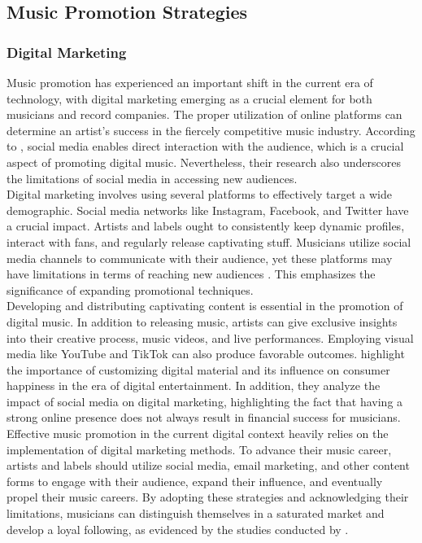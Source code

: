 \subsection{Music Promotion Strategies}
\subsubsection{Digital Marketing}
Music promotion has experienced an important shift in the current era of technology, with digital marketing emerging as a crucial element for both musicians and record companies. The proper utilization of online platforms can determine an artist's success in the fiercely competitive music industry. According to \textcite{haynes18}, social media enables direct interaction with the audience, which is a crucial aspect of promoting digital music. Nevertheless, their research also underscores the limitations of social media in accessing new audiences. \\

Digital marketing involves using several platforms to effectively target a wide demographic. Social media networks like Instagram, Facebook, and Twitter have a crucial impact. Artists and labels ought to consistently keep dynamic profiles, interact with fans, and regularly release captivating stuff. Musicians utilize social media channels to communicate with their audience, yet these platforms may have limitations in terms of reaching new audiences \parencite{haynes18}. This emphasizes the significance of expanding promotional techniques. \\

Developing and distributing captivating content is essential in the promotion of digital music. In addition to releasing music, artists can give exclusive insights into their creative process, music videos, and live performances. Employing visual media like YouTube and TikTok can also produce favorable outcomes. \textcite{basaran22} highlight the importance of customizing digital material and its influence on consumer happiness in the era of digital entertainment. In addition, they analyze the impact of social media on digital marketing, highlighting the fact that having a strong online presence does not always result in financial success for musicians. \\

Effective music promotion in the current digital context heavily relies on the implementation of digital marketing methods. To advance their music career, artists and labels should utilize social media, email marketing, and other content forms to engage with their audience, expand their influence, and eventually propel their music careers. By adopting these strategies and acknowledging their limitations, musicians can distinguish themselves in a saturated market and develop a loyal following, as evidenced by the studies conducted by \textcite{haynes18,basaran22}.


